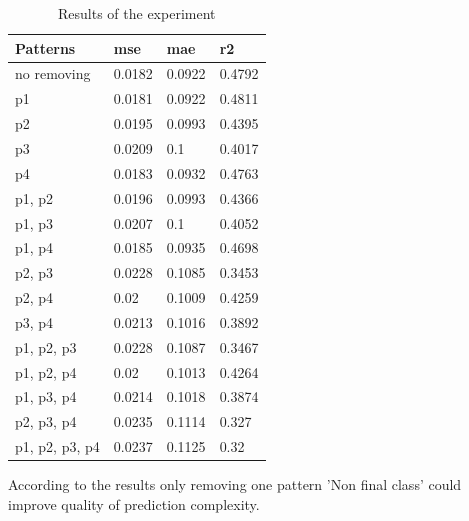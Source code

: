 \documentclass[12pt]{article}
\begin{document}
\begin{table}[h] \centering
\begin{tabular}{ | l | l | l | l |} 
	\hline
	Patterns & mse & mae & r2  \\ \hline
	no removing & 0.0182 & 0.0922 &  0.4792 \\ \hline
	p1 & 0.0181 & 0.0922 & 0.4811  \\ \hline
	p2 & 0.0195 & 0.0993 & 0.4395 \\ \hline
	p3 & 0.0209 & 0.1 & 0.4017 \\ \hline
	p4 & 0.0183 & 0.0932 & 0.4763 \\ \hline
	p1, p2 & 0.0196 & 0.0993 & 0.4366 \\ \hline
	p1, p3 & 0.0207 & 0.1 & 0.4052 \\ \hline
	p1, p4 & 0.0185 & 0.0935 & 0.4698 \\ \hline
	p2, p3 & 0.0228 & 0.1085 & 0.3453 \\ \hline
	p2, p4 & 0.02 & 0.1009 &  0.4259 \\ \hline
	p3, p4 & 0.0213 & 0.1016 & 0.3892 \\ \hline
	p1, p2, p3 & 0.0228 & 0.1087 & 0.3467 \\ \hline
	p1, p2, p4 & 0.02 & 0.1013 & 0.4264 \\ \hline
	p1, p3, p4 & 0.0214 & 0.1018 & 0.3874 \\ \hline
	p2, p3, p4 & 0.0235 & 0.1114 & 0.327 \\ \hline
	p1, p2, p3, p4 & 0.0237 & 0.1125 & 0.32 \\ \hline
\end{tabular}
\label{results}
\caption{Results of the experiment}
\end{table}
\newpage
According to the results only removing one pattern 'Non final class' could improve quality of prediction complexity. 
\end{document}
